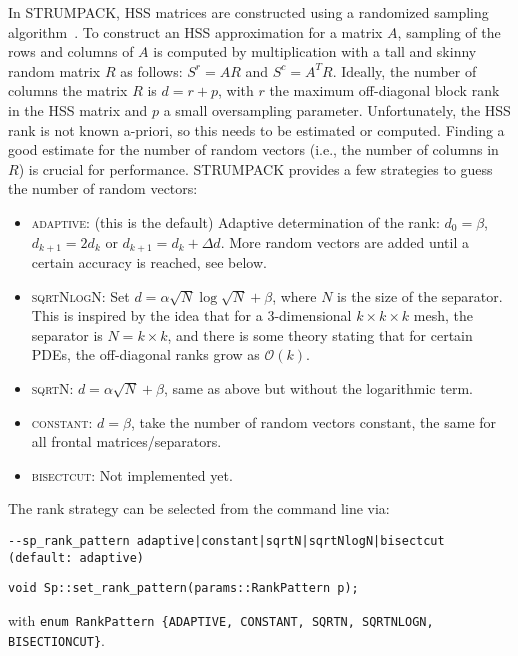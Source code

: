 \documentclass{article}
\begin{document}
In STRUMPACK, HSS matrices are constructed using a randomized sampling
algorithm~\cite{martinsson2011fast}. To construct an HSS approximation
for a matrix $A$, sampling of the rows and columns of $A$ is computed
by multiplication with a tall and skinny random matrix $R$ as follows:
$S^r = A R$ and $S^c = A^T R$. Ideally, the number of columns the
matrix $R$ is $d = r + p$, with $r$ the maximum off-diagonal block
rank in the HSS matrix and $p$ a small oversampling
parameter. Unfortunately, the HSS rank is not known a-priori, so this
needs to be estimated or computed. Finding a good estimate for the
number of random vectors (i.e., the number of columns in $R$) is
crucial for performance. STRUMPACK provides a few strategies to guess
the number of random vectors:
\begin{itemize}
\item \textsc{adaptive}: (this is the default) Adaptive determination
  of the rank: $d_0 = \beta$, $d_{k+1} = 2 d_{k}$ or
  $d_{k+1} = d_{k}+ \Delta d$. More random vectors are added until a
  certain accuracy is reached, see below.
\item \textsc{sqrtNlogN}: Set
  $d = \alpha \sqrt{N} \log{\sqrt{N}} + \beta$, where $N$ is the size
  of the separator. This is inspired by the idea that for a
  3-dimensional $k \times k \times k$ mesh, the separator is
  $N = k \times k$, and there is some theory stating that for certain
  PDEs, the off-diagonal ranks grow as $\mathcal{O}(k)$.
\item \textsc{sqrtN}: $d = \alpha \sqrt{N} + \beta$, same as above but
  without the logarithmic term.
\item \textsc{constant}: $d = \beta$, take the number of random
  vectors constant, the same for all frontal matrices/separators.
\item \textsc{bisectcut}: Not implemented yet.
\end{itemize}
The rank strategy can be selected from the command line via:
\begin{lstlisting}[style=Bash]
  --sp_rank_pattern adaptive|constant|sqrtN|sqrtNlogN|bisectcut (default: adaptive)
\end{lstlisting}
\begin{lstlisting}[style=C]
  void Sp::set_rank_pattern(params::RankPattern p);
\end{lstlisting}
with \lstinline[style=C]!enum RankPattern {ADAPTIVE, CONSTANT, SQRTN, SQRTNLOGN, BISECTIONCUT}!.\\

\end{document}
